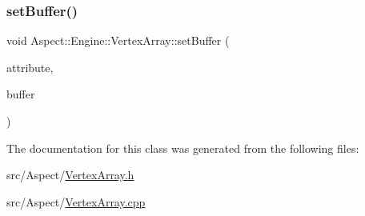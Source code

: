 \mbox{\label{class_aspect_1_1_engine_1_1_vertex_array_a0d986459ab43f774a9201667ff49672f}} 
\subsubsection{\texorpdfstring{set\+Buffer()}{setBuffer()}}
{\footnotesize\ttfamily void Aspect\+::\+Engine\+::\+Vertex\+Array\+::set\+Buffer (\begin{DoxyParamCaption}\item[{std\+::string}]{attribute,  }\item[{\mbox{\hyperlink{class_aspect_1_1_engine_1_1_vertex_buffer}{Vertex\+Buffer}} $\ast$}]{buffer }\end{DoxyParamCaption})}



The documentation for this class was generated from the following files\+:\begin{DoxyCompactItemize}
\item 
src/\+Aspect/\mbox{\hyperlink{_vertex_array_8h}{Vertex\+Array.\+h}}\item 
src/\+Aspect/\mbox{\hyperlink{_vertex_array_8cpp}{Vertex\+Array.\+cpp}}\end{DoxyCompactItemize}
